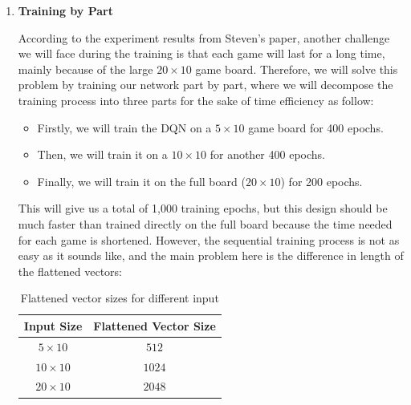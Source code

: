 \documentclass[letterpaper]{article} %
\begin{document}
\begin{itemize}
\begin{enumerate}
Note that we need a describes $\epsilon$ because we want to explore more in the beginning (in our case, we will use $\epsilon=0.5$), and as we approach the end of the training phase, we want to exploit more (which means $\delta = \frac{\epsilon}{\text{\# of training}} = \frac{0.5}{1000} = 0.0005$).\footnote{This gives two extra hyperparameters that need to be adjusted.}

    \item {\bf Training by Part}

    According to the experiment results from Steven's paper, another challenge we will face during the training is that each game will last for a long time, mainly because of the large $20\times 10$ game board. Therefore, we will solve this problem by training our network part by part, where we will decompose the training process into three parts for the sake of time efficiency as follow:
    \begin{itemize}
      \item 
      Firstly, we will train the DQN on a $5\times 10$ game board for 400 epochs.
      \item 
      Then, we will train it on a $10\times 10$ for another 400 epochs.
      \item 
      Finally, we will train it on the full board ($20\times 10$) for 200 epochs.
    \end{itemize}

    This will give us a total of 1,000 training epochs, but this design should be much faster than trained directly on the full board because the time needed for each game is shortened. However, the sequential training process is not as easy as it sounds like, and the main problem here is the difference in length of the flattened vectors:

    \begin{table}[h!]
      \centering
      \normalsize{
        \begin{tabular}{ |c|c| } 
          \hline
          Input Size & Flattened Vector Size  \\ 
          \hline
           $5\times 10$ & $512$  \\ 
           \hline
           $10\times 10$ & $1024$  \\ 
           \hline
           $20\times 10$ & $2048$  \\
           \hline
          \end{tabular}}
      \caption{Flattened vector sizes for different input}
      \label{tab:rewardsCopy}
    \end{table} 


\end{enumerate}
\end{itemize}
\end{document}
